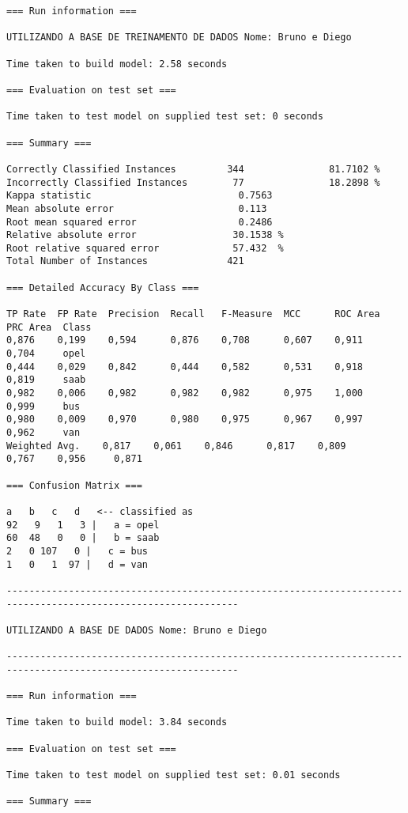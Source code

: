 \documentclass[
	article,			%
	11pt,				%
	oneside,			%
	a4paper,			%
	english,			%
	brazil,				%
	sumario=tradicional
	]{abntex2}
\begin{document}
\begin{lstlisting}
=== Run information ===

UTILIZANDO A BASE DE TREINAMENTO DE DADOS Nome: Bruno e Diego

Time taken to build model: 2.58 seconds

=== Evaluation on test set ===

Time taken to test model on supplied test set: 0 seconds

=== Summary ===

Correctly Classified Instances         344               81.7102 %
Incorrectly Classified Instances        77               18.2898 %
Kappa statistic                          0.7563
Mean absolute error                      0.113 
Root mean squared error                  0.2486
Relative absolute error                 30.1538 %
Root relative squared error             57.432  %
Total Number of Instances              421     

=== Detailed Accuracy By Class ===

TP Rate  FP Rate  Precision  Recall   F-Measure  MCC      ROC Area  PRC Area  Class
0,876    0,199    0,594      0,876    0,708      0,607    0,911     0,704     opel
0,444    0,029    0,842      0,444    0,582      0,531    0,918     0,819     saab
0,982    0,006    0,982      0,982    0,982      0,975    1,000     0,999     bus
0,980    0,009    0,970      0,980    0,975      0,967    0,997     0,962     van
Weighted Avg.    0,817    0,061    0,846      0,817    0,809      0,767    0,956     0,871     

=== Confusion Matrix ===

a   b   c   d   <-- classified as
92   9   1   3 |   a = opel
60  48   0   0 |   b = saab
2   0 107   0 |   c = bus
1   0   1  97 |   d = van

---------------------------------------------------------------------------------------------------------------

UTILIZANDO A BASE DE DADOS Nome: Bruno e Diego

---------------------------------------------------------------------------------------------------------------

=== Run information ===

Time taken to build model: 3.84 seconds

=== Evaluation on test set ===

Time taken to test model on supplied test set: 0.01 seconds

=== Summary ===


\end{lstlisting}
\end{document}
